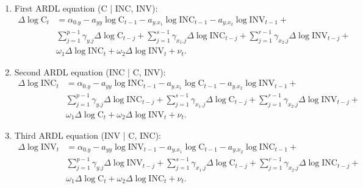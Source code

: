 \begin{enumerate}[I]
    \item First ARDL equation (C | INC, INV):
    \begin{align}
    \Delta \log \text{C}_{t}&=\alpha_{0.y} -
    a_{yy} \log \text{C}_{t-1} - {a}_{y.x_1}\log \text{INC}_{t-1} - {a}_{y.x_2}\log \text{INV}_{t-1} +\\\nonumber
    &\sum_{j=1}^{p-1}\gamma_{y.j} \Delta\log \text{C}_{t-j} +
    \sum_{j=1}^{s-1}\gamma_{x_1.j} \Delta\log \text{INC}_{t-j} +
    \sum_{j=1}^{r-1}\gamma_{x_2.j} \Delta\log \text{INV}_{t-j} +\\\nonumber
    &\omega_1 \Delta\log \text{INC}_{t}+
    \omega_2 \Delta\log \text{INV}_{t}+\nu_{t}. 
    \end{align}

    \item Second ARDL equation (INC | C, INV):
    \begin{align}
    \Delta \log \text{INC}_{t}&=\alpha_{0.y} -
    a_{yy} \log \text{INC}_{t-1} - {a}_{y.x_1}\log \text{C}_{t-1} - {a}_{y.x_2}\log \text{INV}_{t-1} +\\\nonumber
    &\sum_{j=1}^{p-1}\gamma_{y.j} \Delta\log \text{INC}_{t-j} +
    \sum_{j=1}^{s-1}\gamma_{x_1.j} \Delta\log \text{C}_{t-j} +
    \sum_{j=1}^{r-1}\gamma_{x_2.j} \Delta\log \text{INV}_{t-j} +\\\nonumber
    &\omega_1 \Delta\log \text{C}_{t}+
    \omega_2 \Delta\log \text{INV}_{t}+\nu_{t}. 
    \end{align}

    \item Third ARDL equation (INV | C, INC):
    \begin{align}
    \Delta \log \text{INV}_{t}&=\alpha_{0.y} -
    a_{yy} \log \text{INV}_{t-1} - {a}_{y.x_1}\log \text{C}_{t-1} - {a}_{y.x_2}\log \text{INC}_{t-1} +\\\nonumber
    &\sum_{j=1}^{p-1}\gamma_{y.j} \Delta\log \text{INV}_{t-j} +
    \sum_{j=1}^{s-1}\gamma_{x_1.j} \Delta\log \text{C}_{t-j} +
    \sum_{j=1}^{r-1}\gamma_{x_2.j} \Delta\log \text{INC}_{t-j} +\\\nonumber
    &\omega_1 \Delta\log \text{C}_{t}+
    \omega_2 \Delta\log \text{INC}_{t}+\nu_{t}. 
    \end{align}

\end{enumerate}

